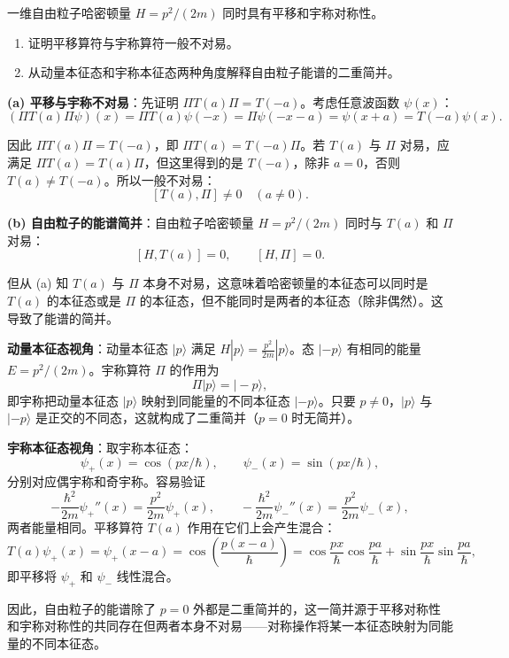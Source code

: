 \begin{question}
一维自由粒子哈密顿量 $H=p^2/(2m)$ 同时具有平移和宇称对称性。
\begin{enumerate}
\item 证明平移算符与宇称算符一般不对易。
\item 从动量本征态和宇称本征态两种角度解释自由粒子能谱的二重简并。
\end{enumerate}
\end{question}
\begin{solution}
	\textbf{(a) 平移与宇称不对易}：先证明 $\Pi T(a)\Pi = T(-a)$。考虑任意波函数 $\psi(x)$：
	\[
	(\Pi T(a)\Pi\psi)(x) = \Pi T(a)\psi(-x) = \Pi\psi(-x-a) = \psi(x+a) = T(-a)\psi(x).
	\]

	因此 $\Pi T(a)\Pi = T(-a)$，即 $\Pi T(a) = T(-a)\Pi$。若 $T(a)$ 与 $\Pi$ 对易，应满足 $\Pi T(a) = T(a)\Pi$，但这里得到的是 $T(-a)$，除非 $a=0$，否则 $T(a)\neq T(-a)$。所以一般不对易：
	\[
	\boxed{[T(a),\Pi]\neq0\quad (a\neq0)}.
	\]

	\textbf{(b) 自由粒子的能谱简并}：自由粒子哈密顿量 $H=p^2/(2m)$ 同时与 $T(a)$ 和 $\Pi$ 对易：
	\[
	[H,T(a)]=0,\qquad [H,\Pi]=0.
	\]

	但从 (a) 知 $T(a)$ 与 $\Pi$ 本身不对易，这意味着哈密顿量的本征态可以同时是 $T(a)$ 的本征态或是 $\Pi$ 的本征态，但不能同时是两者的本征态（除非偶然）。这导致了能谱的简并。

	\textbf{动量本征态视角}：动量本征态 $|p\rangle$ 满足 $H|p\rangle=\frac{p^2}{2m}|p\rangle$。态 $|-p\rangle$ 有相同的能量 $E=p^2/(2m)$。宇称算符 $\Pi$ 的作用为
	\[
	\Pi|p\rangle = |-p\rangle,
	\]
	即宇称把动量本征态 $|p\rangle$ 映射到同能量的不同本征态 $|-p\rangle$。只要 $p\neq0$，$|p\rangle$ 与 $|-p\rangle$ 是正交的不同态，这就构成了二重简并（$p=0$ 时无简并）。

	\textbf{宇称本征态视角}：取宇称本征态：
	\[
	\psi_+(x)=\cos(px/\hbar),\qquad \psi_-(x)=\sin(px/\hbar),
	\]
	分别对应偶宇称和奇宇称。容易验证
	\[
	-\frac{\hbar^2}{2m}\psi_+''(x)=\frac{p^2}{2m}\psi_+(x),\qquad
	-\frac{\hbar^2}{2m}\psi_-''(x)=\frac{p^2}{2m}\psi_-(x),
	\]
	两者能量相同。平移算符 $T(a)$ 作用在它们上会产生混合：
	\[
	T(a)\psi_+(x)=\psi_+(x-a)=\cos\left(\frac{p(x-a)}{\hbar}\right)
	=\cos\frac{px}{\hbar}\cos\frac{pa}{\hbar}+\sin\frac{px}{\hbar}\sin\frac{pa}{\hbar},
	\]
	即平移将 $\psi_+$ 和 $\psi_-$ 线性混合。

	因此，自由粒子的能谱除了 $p=0$ 外都是二重简并的，这一简并源于平移对称性和宇称对称性的共同存在但两者本身不对易——对称操作将某一本征态映射为同能量的不同本征态。
	\end{solution}


